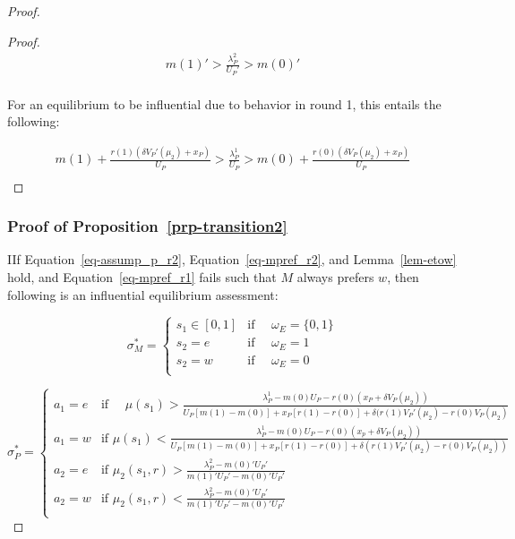 \documentclass[
  12pt,
]{article}
\theoremstyle{plain}
\theoremstyle{plain}
\theoremstyle{remark}
\begin{document}
\begin{proof}
\begin{proof}
\[
\begin{aligned}
m(1)' > \frac{\lambda^2_P }{U_P'} >  m(0)'\\
\end{aligned}
\]

For an equilibrium to be influential due to behavior in round 1, this
entails the following:

\[
\begin{aligned}
m(1) + \frac{r(1)(\delta V_P'(\mu_2) + x_P)}{U_P} > \frac{\lambda^1_P}{U_P} > m(0) + \frac{r(0)(\delta V_P(\mu_2) + x_P)}{U_P}\\
\end{aligned}
\]
\end{proof}

\subsubsection{\texorpdfstring{Proof of
Proposition~\ref{prp-transition2}}{Proof of Proposition~}}\label{proof-of-prp-transition2}

IIf Equation~\ref{eq-assump_p_r2}, Equation~\ref{eq-mpref_r2}, and
Lemma~\ref{lem-etow} hold, and Equation~\ref{eq-mpref_r1} fails such
that \(M\) always prefers \(w\), then following is an influential
equilibrium assessment:

\[
\sigma^{*}_M = 
\begin{cases}
s_1 \in [0, 1] & \text{if } \quad \omega_E = \{0, 1\} \\
s_2 = e  & \text{if } \quad \omega_E = 1\\
s_2 = w  & \text{if } \quad \omega_E = 0\\
\end{cases}
\]

\[
\sigma^{*}_P = 
\begin{cases}
a_1= e  & \text{if } \quad\mu(s_1)
> \frac{\lambda^1_P - m(0)U_P - r(0)(x_P + \delta V_P(\mu_2))}
 {U_P[ m(1) - m(0) ]+ x_P [r(1) -r(0)] 
 + \delta (r(1)V_P'(\mu_2) - r(0)V_P(\mu_2)}\\
a_1 = w  & \text{if } \mu(s_1)
< \frac{\lambda^1_P - m(0)U_P - r(0)(x_p + \delta V_P(\mu_2))}
 {U_P[ m(1) - m(0) ]+ x_P [r(1) -r(0)] 
 + \delta (r(1)V_P'(\mu_2) - r(0)V_P(\mu_2))}\\
a_2 = e & \text{if } \mu_2(s_1, r) > \frac{\lambda^2_P - m(0)' U_P '}{m(1)' U_P' - m(0)' U_P'}\\
a_2 = w & \text{if } \mu_2(s_1, r) < \frac{\lambda^2_P - m(0)' U_P '}{m(1)' U_P' - m(0)' U_P'}\\
\end{cases}
\]


\end{proof}
\end{document}
